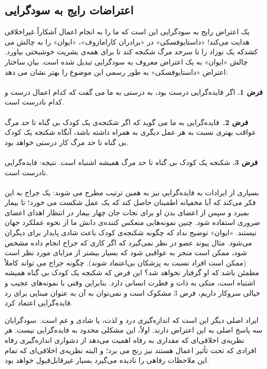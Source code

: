 \documentclass[12pt,oneside]{book}
\begin{document}
    \subsection*{اعتراضات رایج به سودگرایی}
    یک اعتراض رایج به سودگرایی این است که ما را به انجام اعمال آشکاراً غیراخلاقی هدایت می‌کند!
    «داستایوفسکی» در «برادران کارامازوف»، «ایوان» را به چالش می کشدکه یک نوزاد را تا سرحد مرگ شکنجه کند تا برای همه‌ی بشریت خوشبختی بیاورد.
    چالش «ایوان» به یک اعتراض معروف به سودگرایی تبدیل شده است.
    بیان ساختار اعتراض «داستایوفسکی» به طور رسمی این موضوع را بهتر نشان می دهد:
    \\\\
    \textbf{فرض 1.}
    اگر فایده‌گرایی درست بود، به درستی به ما می گفت که کدام اعمال درست و کدام نادرست است.
    \\\\
    \textbf{فرض 2.}\     فایده‌گرایی به ما می گوید که اگر شکنجه‌ی یک کودک بی گناه تا حد مرگ عواقب بهتری نسبت به هر عمل دیگری به همراه داشته باشد، آنگاه شکنجه یک کودک بی گناه تا حد مرگ کار درستی خواهد بود.
    \\\\
    \textbf{فرض 3.}
    شکنجه یک کودک بی گناه تا حد مرگ همیشه اشتباه است.
    نتیجه: فایده‌گرایی نادرست است.
    \\\\
    بسیاری از ایرادات به فایده‌گرایی نیز به همین ترتیب مطرح می شوند: یک جراح به این فکر می‌کند که آیا مخفیانه اطمینان حاصل کند که یک عمل شکست می خورد؛ تا بیمار بمیرد و سپس از اعضای بدن او برای نجات جان چهار بیمار در انتظار اهدای اعضای ضروری استفاده شود.
    چنین نمونه‌هایی منعکس کننده‌ی دانش ما از نحوه عملکرد جهان نیستند.
    «ایوان» توضیح نداد که چگونه شکنجه‌ی کودک باعث شادی پایدار برای دیگران می‌شود.
    مثال پیوند عضو در نظر نمی‌گیرد که اگر کاری که جراح انجام داده مشخص شود، ممکن است منجر به عواقبی شود که بسیار بیشتر از مزایای مورد نظر است (ممکن است افراد نسبت به پزشکان بی‌اعتماد شوند).
    چگونه جراح می تواند کاملاً مطمئن باشد که او گرفتار نخواهد شد؟ این فرض که شکنجه یک کودک بی گناه همیشه اشتباه است، متکی به ذات و فطرت انسانی دارد.
    بنابراین وقتی با نمونه‌های عجیب و خیالی سروکار داریم، فرض 3 مشکوک است و نمی‌توان به آن به عنوان مبنایی برای رد فایده‌گرایی اعتماد کرد.

    ایراد اصلی دیگر این است که اندازه‌گیری درد و لذت، یا شادی و غم است.\     سودگرایان سه پاسخ اصلی به این اعتراض دارند.
    اولاً، این مشکلی محدود به فایده‌گرایی نیست.
    هر نظریه‌ی اخلاقی‌ای که مقداری به رفاه اهمیت می‌دهد از دشواری اندازه‌گیری رفاه افرادی که تحت تأثیر اعمال هستند نیز رنج می برد؛ و البته نظریه‌ی اخلاقی‌ای که تمام این ملاحظات رفاهی را نادیده می‌گیرد بسیار غیرقابل‌قبول خواهد بود.
\end{document}
